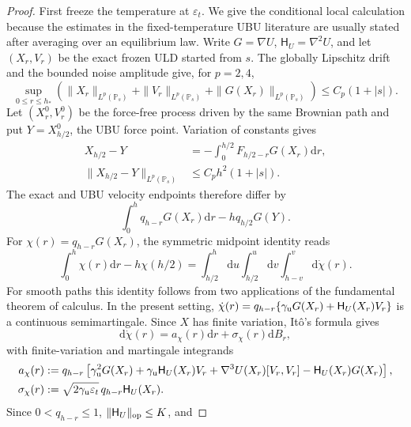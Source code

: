 \documentclass[11pt]{article}
\theoremstyle{definition}
\newcommand{\dd}{\mathrm d}
\newcommand{\eps}{\varepsilon}
\begin{document}
\begin{proof}
First freeze the temperature at $\eps_t$. We give the conditional local
calculation because the estimates in the fixed-temperature UBU literature are
usually stated after averaging over an equilibrium law. Write
$G=\nabla U$, $\mathsf H_U=\nabla^2U$, and let $(X_r,V_r)$ be the exact frozen ULD
started from $s$. The globally Lipschitz drift and the bounded noise amplitude
give, for $p=2,4$,
\begin{equation}\label{eq:ubuconditionalmoments}
 \sup_{0\leq r\leq h_*}
 \left(\|X_r\|_{L^p(\mathbb P_s)}+\|V_r\|_{L^p(\mathbb P_s)}
       +\|G(X_r)\|_{L^p(\mathbb P_s)}\right)
 \leq C_p(1+|s|).
\end{equation}
Let $\left(X_r^0,V_r^0\right)$ be the force-free process driven by the same Brownian
path and put $Y=X_{h/2}^0$, the UBU force point. Variation of constants gives
\begin{equation}\label{eq:ubuforcepoint}
\begin{aligned}
 X_{h/2}-Y&=-\int_0^{h/2}F_{h/2-r}G(X_r)\dd r,\\
 \|X_{h/2}-Y\|_{L^p(\mathbb P_s)}
 &\leq C_ph^2(1+|s|).
\end{aligned}
\end{equation}
The exact and UBU velocity endpoints therefore differ by
\[
 \int_0^h q_{h-r}G(X_r)\dd r-hq_{h/2}G(Y).
\]
For $\chi(r)=q_{h-r}G(X_r)$, the symmetric midpoint identity reads
\begin{equation}\label{eq:ubumidpointidentity}
 \int_0^h\chi(r)\dd r-h\chi(h/2)
 =\int_{h/2}^h\dd u\int_{h/2}^u\dd v
       \int_{h-v}^{v}\dd\dot\chi(r).
\end{equation}
For smooth paths this identity follows from two applications of the
fundamental theorem of calculus. In the present setting,
$\dot\chi(r)=q_{h-r}\{\gamma_{\rm u}G(X_r)+\mathsf H_U(X_r)V_r\}$ is a continuous
semimartingale. Since $X$ has finite variation, It\^o's formula gives
\begin{equation}\label{eq:ubuchiito}
 \dd\dot\chi(r)=a_\chi(r)\dd r+\sigma_\chi(r)\dd B_r,
\end{equation}
with finite-variation and martingale integrands
\begin{align*}
 a_\chi(r)&:=q_{h-r}\left[
 \gamma_{\rm u}^2G(X_r)+\gamma_{\rm u}\mathsf H_U(X_r)V_r
 +\nabla^3U(X_r)[V_r,V_r]-\mathsf H_U(X_r)G(X_r)\right],\\
 \sigma_\chi(r)&:=\sqrt{2\gamma_{\rm u}\eps_t}\,q_{h-r}\mathsf H_U(X_r).
\end{align*}
Since $0<q_{h-r}\leq1$, $\|\mathsf H_U\|_{\rm op}\leq K$, and

\end{proof}
\end{document}
